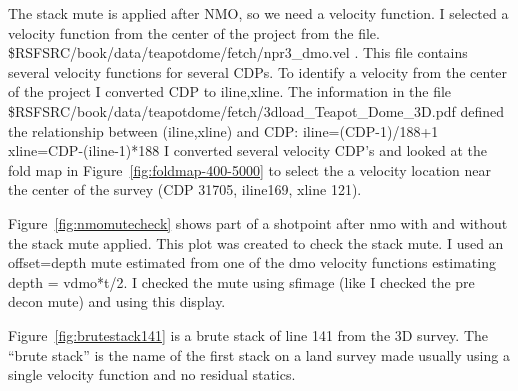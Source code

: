 The stack mute is applied after NMO, so we need a velocity function.  I selected a velocity function from the center of the project from the file. \$RSFSRC/book/data/teapotdome/fetch/npr3\_dmo.vel . This file contains several velocity functions for several CDPs.  To identify a velocity from the center of the project I converted CDP to iline,xline.  The information in the file  \$RSFSRC/book/data/teapotdome/fetch/3dload\_Teapot\_Dome\_3D.pdf defined the relationship between (iline,xline) and CDP:
iline=(CDP-1)/188+1
xline=CDP-(iline-1)*188
I converted several velocity CDP’s and looked at the fold map in Figure~\ref{fig:foldmap-400-5000} to select the a velocity location near the center of the survey (CDP 31705, iline169, xline 121).

Figure~\ref{fig:nmomutecheck} shows part of a shotpoint after nmo with and without the stack mute applied.  This plot was created to check the stack mute.  I used an offset=depth mute estimated from one of the dmo velocity functions estimating depth = vdmo*t/2.   I checked the mute using sfimage (like I checked the pre decon mute) and using this display.

Figure~\ref{fig:brutestack141} is a brute stack of line 141 from the 3D survey.  The “brute stack” is the name of the first stack on a land survey made usually using a single velocity function and no residual statics.






